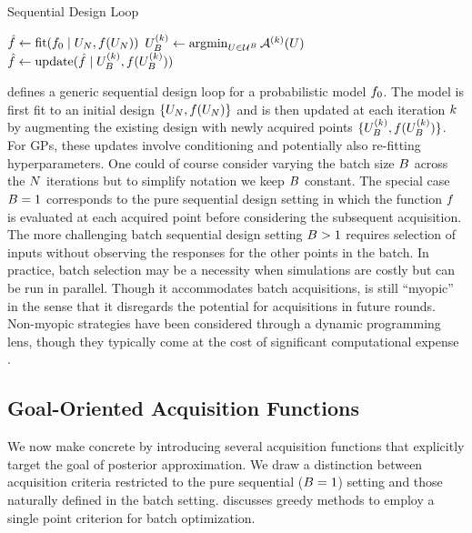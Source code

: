 \documentclass[12pt]{article}
\begin{document}
\begin{algorithm}
    \caption{Sequential Design Loop}
    \label{alg:seq-des-loop}
    \begin{algorithmic}[1] %
    	\State $\hat{\func} \gets \mathrm{fit}(\funcPrior \given \designIn[\Ndesign], \func(\designIn[\Ndesign]))$
         
        		\State $\designBatchIn^{(\designIndex)} \gets \argmin_{\parMat \in \parSpace^{\Nbatch}} \acq[]^{(\designIndex)}(\parMat)$ 
		\State $\hat{f} \gets \mathrm{update}(\hat{f} \given \designBatchIn^{(\designIndex)}, \func(\designBatchIn^{(\designIndex)}))$
	\EndFor
	\EndFunction
    \end{algorithmic}
\end{algorithm}

 defines a generic sequential design loop for a probabilistic model $\funcPrior$. 
The model is first
fit to an initial design $\{\designIn[\Ndesign], \func(\designIn[\Ndesign])\}$ and is then 
updated at each iteration $\designIndex$ by augmenting the existing design with newly 
acquired points $\{\designBatchIn^{(\designIndex)}, \func(\designBatchIn^{(\designIndex)})\}$.
For GPs, these updates involve conditioning and potentially also re-fitting hyperparameters. 
One could of course consider varying the batch size $\Nbatch$ across the $\Ndesign$ iterations but to simplify notation
we keep $\Nbatch$ constant. The special case $\Nbatch = 1$ corresponds to the 
pure sequential design setting in which the function $\func$ is evaluated at each acquired point before
considering the subsequent acquisition. The more challenging batch sequential design setting
$\Nbatch > 1$ requires selection of inputs without observing the responses for the other points
in the batch. In practice, batch selection may be a necessity when simulations are costly but can 
be run in parallel. Though it accommodates batch acquisitions,  is
still ``myopic'' in the sense that it disregards the potential for acquisitions in future rounds. 
Non-myopic strategies have been considered
through a dynamic programming lens, though they typically come at the cost of significant 
computational expense \citep{SURThesis, supermartingaleSUR}.

\subsection{Goal-Oriented Acquisition Functions}
We now make  concrete by introducing several acquisition functions
that explicitly target the goal of posterior approximation. We draw a distinction between 
acquisition criteria restricted to the pure sequential ($\Nbatch = 1$) setting
and those naturally defined in the batch setting.  discusses 
greedy methods to employ a single point criterion for batch optimization.
\end{document}
